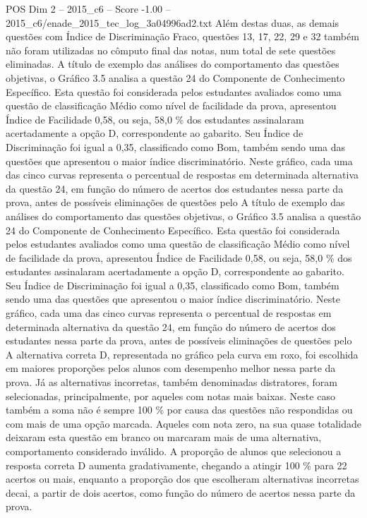 \begin{textsample}{POS Dim 2 – 2015\_c6 – Score -1.00 – 2015\_c6/enade\_2015\_tec\_log\_3a04996ad2.txt}
Além destas duas, as demais questões com Índice de Discriminação Fraco, questões 13, 17, 22, 29 e 32 também não foram utilizadas no cômputo final das notas, num total de sete questões eliminadas.
A título de exemplo das análises do comportamento das questões objetivas, o Gráfico 3.5 analisa a questão 24 do Componente de Conhecimento Específico.
Esta questão foi considerada pelos estudantes avaliados como uma questão de classificação Médio como nível de facilidade da prova, apresentou Índice de Facilidade 0,58, ou seja, 58,0 \% dos estudantes assinalaram acertadamente a opção D, correspondente ao gabarito.
Seu Índice de Discriminação foi igual a 0,35, classificado como Bom, também sendo uma das questões que apresentou o maior índice discriminatório.
Neste gráfico, cada uma das cinco curvas representa o percentual de respostas em determinada alternativa da questão 24, em função do número de acertos dos estudantes nessa parte da prova, antes de possíveis eliminações de questões pelo A título de exemplo das análises do comportamento das questões objetivas, o Gráfico 3.5 analisa a questão 24 do Componente de Conhecimento Específico.
Esta questão foi considerada pelos estudantes avaliados como uma questão de classificação Médio como nível de facilidade da prova, apresentou Índice de Facilidade 0,58, ou seja, 58,0 \% dos estudantes assinalaram acertadamente a opção D, correspondente ao gabarito.
Seu Índice de Discriminação foi igual a 0,35, classificado como Bom, também sendo uma das questões que apresentou o maior índice discriminatório.
Neste gráfico, cada uma das cinco curvas representa o percentual de respostas em determinada alternativa da questão 24, em função do número de acertos dos estudantes nessa parte da prova, antes de possíveis eliminações de questões pelo A alternativa correta D, representada no gráfico pela curva em roxo, foi escolhida em maiores proporções pelos alunos com desempenho melhor nessa parte da prova.
Já as alternativas incorretas, também denominadas distratores, foram selecionadas, principalmente, por aqueles com notas mais baixas.
Neste caso também a soma não é sempre 100 \% por causa das questões não respondidas ou com mais de uma opção marcada.
Aqueles com nota zero, na sua quase totalidade deixaram esta questão em branco ou marcaram mais de uma alternativa, comportamento considerado inválido.
A proporção de alunos que selecionou a resposta correta D aumenta gradativamente, chegando a atingir 100 \% para 22 acertos ou mais, enquanto a proporção dos que escolheram alternativas incorretas decai, a partir de dois acertos, como função do número de acertos nessa parte da prova.

\end{textsample}
